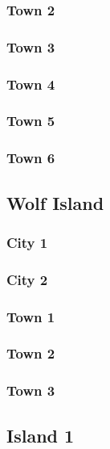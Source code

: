 		\subsubsection{Town 2}

		\subsubsection{Town 3}

		\subsubsection{Town 4}

		\subsubsection{Town 5}

		\subsubsection{Town 6}

	\subsection{Wolf Island}

		\subsubsection{City 1}

		\subsubsection{City 2}

		\subsubsection{Town 1}

		\subsubsection{Town 2}

		\subsubsection{Town 3}

	\subsection{Island 1}


